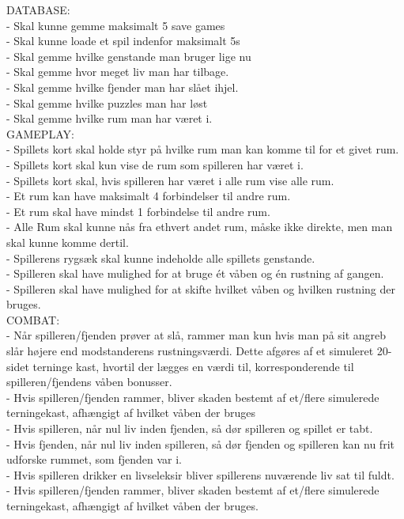   DATABASE:\\
    - Skal kunne gemme maksimalt 5 save games\\
    - Skal kunne loade et spil indenfor maksimalt 5s\\
    - Skal gemme hvilke genstande man bruger lige nu\\
    - Skal gemme hvor meget liv man har tilbage.\\
    - Skal gemme hvilke fjender man har slået ihjel.\\
    - Skal gemme hvilke puzzles man har løst\\
    - Skal gemme hvilke rum man har været i.\\
    
  GAMEPLAY:\\
    - Spillets kort skal holde styr på hvilke rum man kan komme til for et givet rum.\\
    - Spillets kort skal kun vise de rum som spilleren har været i.\\
    - Spillets kort skal, hvis spilleren har været i alle rum vise alle rum.\\
    
    - Et rum kan have maksimalt 4 forbindelser til andre rum.\\
    - Et rum skal have mindst 1 forbindelse til andre rum.\\
    - Alle Rum skal kunne nås fra ethvert andet rum, måske ikke direkte, men man skal kunne komme dertil.\\
    
    - Spillerens rygsæk skal kunne indeholde alle spillets genstande.\\
    - Spilleren skal have mulighed for at bruge ét våben og én rustning af gangen.\\
    - Spilleren skal have mulighed for at skifte hvilket våben og hvilken rustning der bruges.\\
   
  COMBAT:\\
    - Når spilleren/fjenden prøver at slå, rammer man kun hvis man på sit angreb slår højere end modstanderens rustningsværdi. Dette afgøres af et simuleret 20-sidet terninge kast, hvortil der lægges en værdi til, korresponderende til spilleren/fjendens våben bonusser.\\
    - Hvis spilleren/fjenden rammer, bliver skaden bestemt af et/flere simulerede terningekast, afhængigt af hvilket våben der bruges\\
    - Hvis spilleren, når nul liv inden fjenden, så dør spilleren og spillet er tabt.\\
    - Hvis fjenden, når nul liv inden spilleren, så dør fjenden og spilleren kan nu frit udforske rummet, som fjenden var i.\\
    - Hvis spilleren drikker en livseleksir bliver spillerens nuværende liv sat til fuldt.\\
    - Hvis spilleren/fjenden rammer, bliver skaden bestemt af et/flere simulerede terningekast, afhængigt af hvilket våben der bruges.\\

